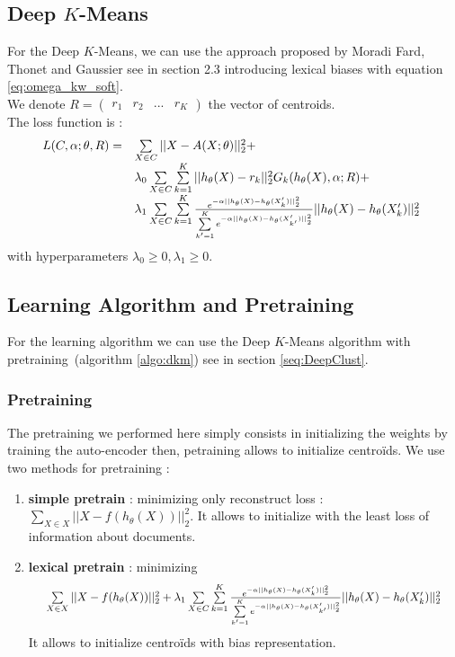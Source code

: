 \subsection{Deep $K$-Means}

For the Deep $K$-Means, we can use the approach proposed by Moradi Fard, Thonet 
and Gaussier \cite{Deap-K-Means} see in section 2.3 introducing lexical biases 
with equation \ref{eq:omega_kw_soft}.
\\We denote $R = \begin{pmatrix} r_1 & r_2 & ... & r_K\end{pmatrix}$ the vector 
of centroids.\\
The loss function is :
\begin{equation}
\resizebox{0.91\hsize}{!}{%
$
\begin{array}{ll}
L(C ,\alpha;\theta,R) = & \sum\limits_{X \in C} ||X - A(X;\theta)||_2^2 + 
\\ & \lambda_0 \sum\limits_{X \in C}\sum\limits_{k=1}^K||h_\theta(X) - r_k ||_2^2 G_{k}(h_\theta(X), \alpha; R) + 
\\ & \lambda_1\sum\limits_{X \in C} \sum\limits_{k = 1}^K \frac{e^{-\alpha|| h_\theta(X) - 
h_\theta(X'_k)||_2^2}}{\sum\limits_{k' = 1}^K e^{-\alpha|| h_\theta(X) - 
h_\theta(X'_{k'})||_2^2}}|| h_\theta(X) - h_\theta(X'_{k})||_2^2
\end{array}
$
}
\end{equation}
with hyperparameters $\lambda_0 \geq 0, \lambda_1 \geq 0$.\\

\subsection{Learning Algorithm and Pretraining}

For the learning algorithm we can use the Deep $K$-Means algorithm with 
pretraining~(algorithm \ref{algo:dkm}) see in section \ref{seq:DeepClust}. 
 
\subsubsection{Pretraining}\label{sec:pre}
The pretraining we performed here simply consists in initializing the weights by training 
the auto-encoder then, petraining allows to initialize centroïds.
We use two methods for pretraining : 
\begin{enumerate} 
\item \textbf{simple pretrain} : minimizing only reconstruct loss :
  $\sum\limits_{X \in X} || X - f(h_\theta(X))||_2^2$. It allows to 
  initialize with the least loss of information about documents.   
\item \textbf{lexical pretrain} : minimizing $$
\resizebox{0.91\hsize}{!}{$\sum\limits_{X \in X} || X - f(h_\theta(X))||_2^2 + 
  \lambda_1 \sum\limits_{X \in C} \sum\limits_{k = 1}^K \frac{e^{-\alpha|| h_\theta(X) - 
h_\theta(X'_k)||_2^2}}{\sum\limits_{k' = 1}^K e^{-\alpha|| h_\theta(X) - 
h_\theta(X'_{k'})||_2^2}}|| h_\theta(X) - h_\theta(X'_{k})||_2^2$}$$ 
  It allows to initialize centroïds with bias representation.
\end{enumerate}

